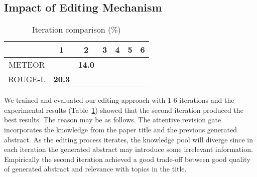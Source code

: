 \documentclass[11pt,a4paper]{article}
\begin{document}
\subsection{Impact of Editing Mechanism}
\begin{table}[!htb]
\small
\centering
    \begin{tabular}{|c|c|c|c|c|c|c|}\hline
         	& \bf 1     & \bf 2     &\bf 3   & \bf 4  &\bf 5  & \bf 6 \\ \hline METEOR  &     & \bf14.0   &  &  &  &  \\ \hline ROUGE-L & \bf20.3   &  	 &  &  &  &  \\ \hline \end{tabular}
\caption{Iteration comparison (\%)}
\label{iteration}
\end{table}
We trained and evaluated our editing approach with 1-6 iterations and the experimental results (Table~\ref{iteration}) showed that the second iteration produced the best results. The reason may be as follows. The attentive revision gate incorporates the knowledge from the paper title and the previous generated abstract. As the editing process iterates, the knowledge pool will diverge since in each iteration the generated abstract may introduce some irrelevant information. Empirically the second iteration achieved a good trade-off between good quality of generated abstract and relevance with topics in the title. 
\end{document}
